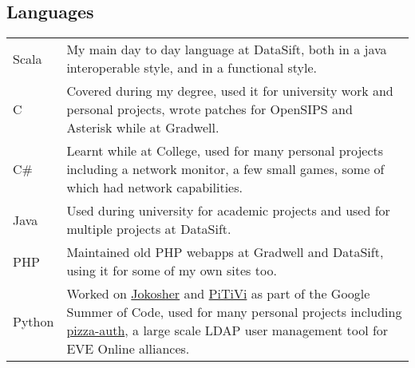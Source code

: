 \documentclass[a4paper]{article}
\begin{document}
\subsection*{Languages}
\begin{tabular}{ l p{14cm} }
Scala & My main day to day language at DataSift, both in a java interoperable style, and in a functional style.\\
C & Covered during my degree, used it for university work and personal projects, wrote patches for OpenSIPS and Asterisk while at Gradwell.\\
C\# & Learnt while at College, used for many personal projects including a network monitor, a few small games, some of which had network capabilities.\\
Java & Used during university for academic projects and used for multiple projects at DataSift.\\
PHP & Maintained old PHP webapps at Gradwell and DataSift, using it for some of my own sites too.\\
    Python & Worked on \href{http://www.jokosher.org/}{Jokosher} and \href{http://www.pitivi.org}{PiTiVi} as part of the Google Summer of Code, used for many personal projects including \href{https://github.com/andimiller/pizza-auth}{pizza-auth}, a large scale LDAP user management tool for EVE Online alliances.
\end{tabular}
\end{document}
